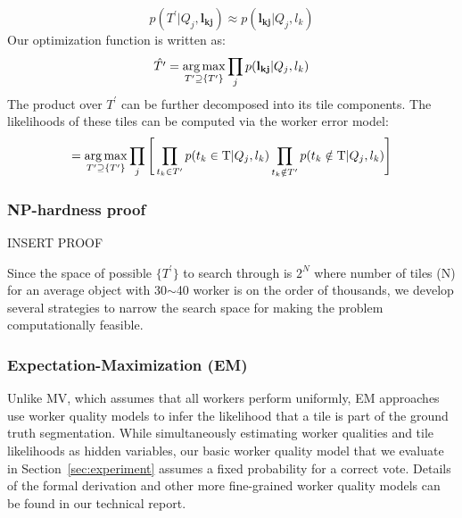 \begin{equation}
p(T^\prime| Q_j,\mathbf{l_{kj}})
\approx p(\mathbf{l_{kj}}|Q_j,l_k)
\end{equation}
Our optimization function is written as:
\begin{equation}
\hat{T^\prime}=\operatorname*{arg\,max}_{T^\prime\supseteq \{T^\prime\} } \prod_j p(\mathbf{l_{kj}}|Q_j,l_k)
\end{equation}
 The product over $T^\prime$ can be further decomposed into its tile components. The likelihoods of these tiles can be computed via the worker error model: 
\begin{equation}
=\operatorname*{arg\,max}_{T^\prime\supseteq \{T^\prime\}} \prod_j\Bigg[\prod_{t_k\in T^\prime} p(t_k\in \mathrm{T}|Q_j,l_k)\prod_{t_k\notin T^\prime} p(t_k\notin \mathrm{T}|Q_j,l_k)\Bigg]
\end{equation}

\subsubsection{NP-hardness proof}
INSERT PROOF

Since the space of possible $\{T^{\prime}\}$ to search through is $2^{N}$ where number of tiles (N) for an average object with 30$\sim$40 worker is on the order of thousands, we develop several strategies to narrow the search space for making the problem computationally feasible. 
\subsubsection{Expectation-Maximization (EM)}
\par \noindent Unlike MV, which assumes that all workers perform uniformly, EM approaches use worker quality models to infer the likelihood that a tile is part of the ground truth segmentation. While simultaneously estimating worker qualities and tile likelihoods as hidden variables, 
our basic worker quality model that we evaluate in Section~\ref{sec:experiment} assumes a fixed probability for a correct vote.
Details of the formal derivation and other more fine-grained worker quality models can be found in our technical report.

